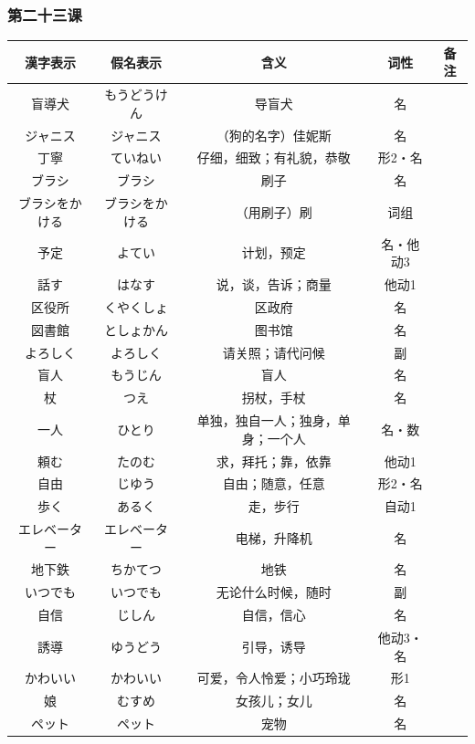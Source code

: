 \subsubsection{第二十三课}
\begin{longtable}{|c|c|c|c|c|}
    \hline
    漢字表示 & 假名表示  & 含义 & 词性 & 备注 \\ \hline\hline
    盲導犬 & もうどうけん & 导盲犬 & 名 & \\ \hline
    ジャニス & ジャニス & （狗的名字）佳妮斯 & 名 & \\ \hline
    丁寧 & ていねい & 仔细，细致；有礼貌，恭敬 & 形2・名 & \\ \hline
    ブラシ & ブラシ & 刷子 & 名 & \\ \hline
    ブラシをかける & ブラシをかける & （用刷子）刷 & 词组 & \\ \hline
    予定 & よてい & 计划，预定 & 名・他动3 & \\ \hline
    話す & はなす & 说，谈，告诉；商量 & 他动1 & \\ \hline
    区役所 & くやくしょ & 区政府 & 名 & \\ \hline
    図書館 & としょかん & 图书馆 & 名 & \\ \hline
    よろしく & よろしく & 请关照；请代问候 & 副 & \\ \hline
    盲人 & もうじん & 盲人 & 名 & \\ \hline
    杖 & つえ & 拐杖，手杖 & 名 & \\ \hline
    一人 & ひとり & 单独，独自一人；独身，单身；一个人 & 名・数 & \\ \hline
    頼む & たのむ & 求，拜托；靠，依靠 & 他动1 & \\ \hline
    自由 & じゆう & 自由；随意，任意 & 形2・名 & \\ \hline
    歩く & あるく & 走，步行 & 自动1 & \\ \hline
    エレベーター & エレベーター & 电梯，升降机 & 名 & \\ \hline
    地下鉄 & ちかてつ & 地铁 & 名 & \\ \hline
    いつでも & いつでも & 无论什么时候，随时 & 副 & \\ \hline
    自信 & じしん & 自信，信心 & 名 & \\ \hline
    誘導 & ゆうどう & 引导，诱导 & 他动3・名 & \\ \hline
    かわいい & かわいい & 可爱，令人怜爱；小巧玲珑 & 形1 & \\ \hline
    娘 & むすめ & 女孩儿；女儿 & 名 & \\ \hline
    ペット & ペット & 宠物 & 名 & \\ \hline

\end{longtable}
